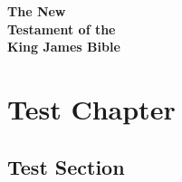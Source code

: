 \documentclass[twoside]{memoir}
\begin{document}
\begin{titlepage}
\thispagestyle{empty}
\vspace*{\fill}
\begin{center}
{\Huge\bfseries The New}\\[1em]
{\Huge\bfseries Testament of the}\\[1em]
{\Huge\bfseries King James Bible}
\end{center}
\vspace*{\fill}
\end{titlepage}

\tableofcontents*
\newpage

\chapter*{Test Chapter}
\section*{Test Section}
\end{document}
